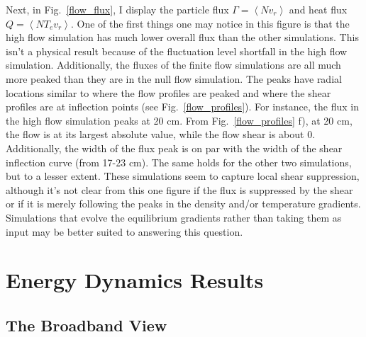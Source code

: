 Next, in Fig.~\ref{flow_flux}, I display the particle flux $\Gamma = \left< N v_r \right>$ and heat flux $Q = \left< N T_e v_r \right> $. 
One of the first things one may notice in this figure is that the high flow simulation has much lower overall flux than the other simulations. 
This isn't a physical result because of the fluctuation level shortfall in the high flow simulation.
Additionally, the fluxes of the finite flow simulations are all much more peaked than they are in the null flow simulation. The peaks have radial locations similar to
where the flow profiles are peaked and where the shear profiles are at inflection points (see Fig.~\ref{flow_profiles}). For instance, the flux in the high flow simulation peaks at 20 cm.
From Fig.~\ref{flow_profiles} f), at 20 cm, the flow is at its largest absolute value, while the flow shear is about 0. Additionally, the width of the flux peak is on par with the width
of the shear inflection curve (from 17-23 cm). The same holds for the other two simulations, but to a lesser extent. These simulations seem to capture local shear suppression, although it's
not clear from this one figure if the flux is suppressed by the shear or if it is merely following the peaks in the density and/or temperature gradients. Simulations that evolve the equilibrium
gradients rather than taking them as input may be better suited to answering this question.

\section{Energy Dynamics Results}
\label{s_flow_en_dyn}

\subsection{The Broadband View}
\label{ss_broad_view}

